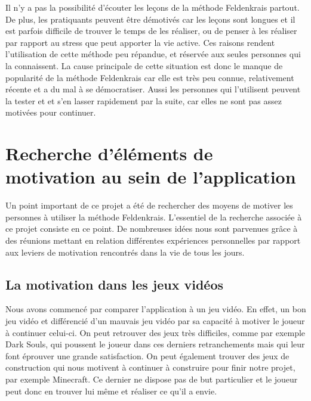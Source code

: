 \documentclass[pidr]{tnreport}
\begin{document}
Il n’y a pas la possibilité d’écouter les leçons de la méthode Feldenkrais partout. De plus, les pratiquants peuvent être démotivés car les leçons sont longues et il est parfois difficile de trouver le temps de les réaliser, ou de penser à les réaliser par rapport au stress que peut apporter la vie active. Ces raisons rendent l’utilisation de cette méthode peu répandue, et réservée aux seules personnes qui la connaissent. La cause principale de cette situation est donc le manque de popularité de la méthode Feldenkrais car elle est très peu connue, relativement récente et a du mal à se démocratiser. Aussi les personnes qui l’utilisent peuvent la tester et et s’en lasser rapidement par la suite, car elles ne sont pas assez motivées pour continuer.



\section{Recherche d’éléments de motivation au sein de l’application}

Un point important de ce projet a été de rechercher des moyens de motiver les personnes à utiliser la méthode Feldenkrais. L’essentiel de la recherche associée à ce projet consiste en ce point. De nombreuses idées nous sont parvenues grâce à des réunions mettant en relation différentes expériences personnelles par rapport aux leviers de motivation rencontrés dans la vie de tous les jours.

\subsection{La motivation dans les jeux vidéos}

Nous avons commencé par comparer l’application à un jeu vidéo. En effet, un bon jeu vidéo et différencié d’un mauvais jeu vidéo par sa capacité à motiver le joueur à continuer celui-ci. On peut retrouver des jeux très difficiles, comme par exemple Dark Souls, qui poussent le joueur dans ces derniers retranchements mais qui leur font éprouver une grande satisfaction. On peut également trouver des jeux de construction qui nous motivent à continuer à construire pour finir notre projet, par exemple Minecraft. Ce dernier ne dispose pas de but particulier et le joueur peut donc en trouver lui même et réaliser ce qu’il a envie.
\end{document}

